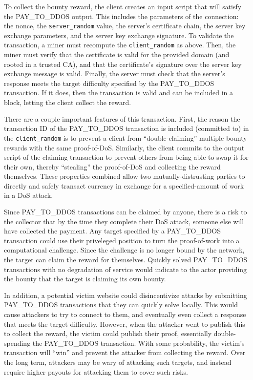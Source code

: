 To collect the bounty reward, the client creates an input script that will
satisfy the PAY\_TO\_DDOS output. This includes the parameters of the
connection: the nonce, the \texttt{server\_random} value, the server's
certificate chain, the server key exchange parameters, and the server key
exchange signature. To validate the transaction, a miner must recompute the
\texttt{client\_random} as above. Then, the miner must verify that the
certificate is valid for the provided domain (and rooted in a trusted CA), and
that the certificate's signature over the server key exchange message is valid.
Finally, the server must check that the server's response meets the target
difficulty specified by the PAY\_TO\_DDOS transaction. If it does, then the
transaction is valid and can be included in a block, letting the client collect
the reward.

There are a couple important features of this transaction. First, the reason the
transaction ID of the PAY\_TO\_DDOS transaction is included (committed to) in
the \texttt{client\_random} is to prevent a client from ``double-claiming''
multiple bounty rewards with the same proof-of-DoS. Similarly, the client
commits to the output script of the claiming transaction to
prevent others from being able to swap it for their own, thereby ``stealing'' the
proof-of-DoS and collecting the reward themselves. These properties combined allow two
mutually-distrusting parties to directly and safely transact currency in
exchange for a specified-amount of work in a DoS attack.



Since PAY\_TO\_DDOS transactions can be claimed by anyone, there is a risk to
the collector that by the time they complete their DoS attack, someone else will
have collected the payment. Any target specified by a PAY\_TO\_DDOS transaction
could use their priveleged position to turn the proof-of-work into a computational challenge.
Since the challenge is no longer bound by the network, the target can claim the reward for
themselves. Quickly solved PAY\_TO\_DDOS transactions with no degradation of service
would indicate to the actor providing the bounty that the target is claiming its own bounty.

In addition, a potential victim website could
disincentivize attacks by submitting PAY\_TO\_DDOS transactions that they can
quickly solve locally. This would cause attackers to try to connect to them, and
eventually even collect a response that meets the target difficulty. However,
when the attacker went to publish this to collect the reward, the victim could
publish their proof, essentially double-spending the PAY\_TO\_DDOS transaction.
With some probability, the victim's transaction will ``win'' and prevent the
attacker from collecting the reward. Over the long term, attackers may be wary
of attacking such targets, and instead require higher payouts for attacking them
to cover such risks.


